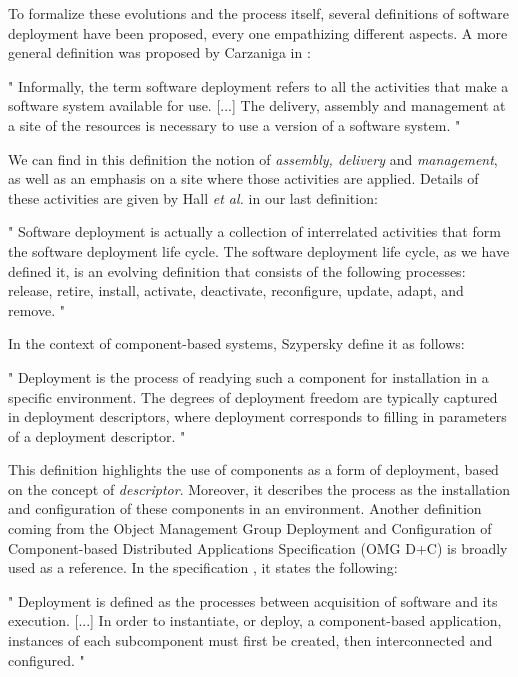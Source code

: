 To formalize these evolutions and the process itself, several definitions of software deployment have been proposed, every one empathizing different aspects. A more general definition was proposed by Carzaniga in  \cite{carzaniga1997characterization}:
\begin{citeverbatim}
	" Informally, the term software deployment refers to all the activities that make a software system available for use. [...] The delivery, assembly and management at a site of the resources is necessary to use a version of a software system. "
\end{citeverbatim}
We can find in this definition the notion of \textit{assembly, delivery} and \textit{management}, as well as an emphasis on a site where those activities are applied.
Details of these activities are given by Hall \textit{et al.} \cite{hall1999cooperative} in our last definition:
\begin{citeverbatim}
	" Software deployment is actually a collection of interrelated activities that form the software deployment life cycle. 
	The software deployment life cycle, as we have defined it, is an evolving definition that consists of the following processes: release, retire, install, activate, deactivate, reconfigure, update, adapt, and remove. "
\end{citeverbatim}

In the context of component-based systems, Szypersky \cite{szyperski2003component} define it as follows:
\begin{citeverbatim}
	" Deployment is the process of readying such a component for installation in a specific environment. 
	The degrees of deployment freedom are typically captured in deployment descriptors, where deployment corresponds to filling in parameters of a deployment descriptor. "
\end{citeverbatim}
This definition highlights the use of components as a form of deployment, based on the concept of \textit{descriptor}.
Moreover, it describes the process as the installation and configuration of these components in an environment.
Another definition coming from the Object Management Group Deployment and Configuration of Component-based Distributed Applications Specification (OMG D+C) is broadly used as a reference.
In the specification  \cite{specification2006deployment}, it states the following:
\begin{citeverbatim}
	" Deployment is defined as the processes between acquisition of software and its execution. [...] In order to instantiate, or deploy, a component-based application, instances of each subcomponent must first be created, then interconnected and configured. "
\end{citeverbatim}

